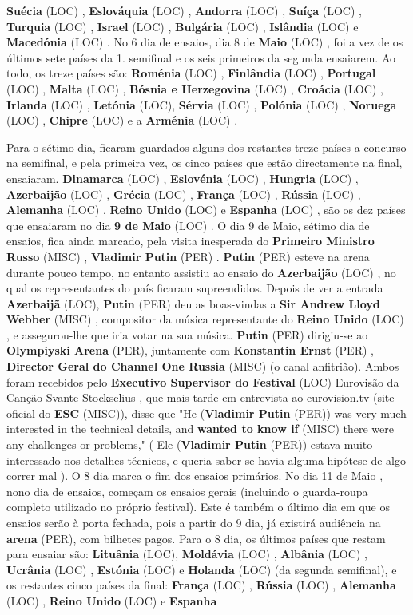 \documentclass[12pt,a4paper]{article}
\begin{document}
\textbf{Suécia} (LOC) , \textbf{Eslováquia} (LOC) , \textbf{Andorra} (LOC) , \textbf{Suíça} (LOC) , \textbf{Turquia} (LOC) , \textbf{Israel} (LOC) , \textbf{Bulgária} (LOC) , \textbf{Islândia} (LOC) e \textbf{Macedónia} (LOC) . No 6 dia de ensaios, dia 8 de \textbf{Maio} (LOC) , foi a vez de os últimos sete países da 1. semifinal e os seis primeiros da segunda ensaiarem. Ao todo, os treze países são: \textbf{Roménia} (LOC) , \textbf{Finlândia} (LOC) , \textbf{Portugal} (LOC) , \textbf{Malta} (LOC) , \textbf{Bósnia e Herzegovina} (LOC) , \textbf{Croácia} (LOC) , \textbf{Irlanda} (LOC) , \textbf{Letónia} (LOC), \textbf{Sérvia} (LOC) , \textbf{Polónia} (LOC) , \textbf{Noruega} (LOC) , \textbf{Chipre} (LOC) e a \textbf{Arménia} (LOC) .

Para o sétimo dia, ficaram guardados alguns dos restantes treze países a concurso na semifinal, e pela primeira vez, os cinco países que estão directamente na final, ensaiaram. \textbf{Dinamarca} (LOC) , \textbf{Eslovénia} (LOC) , \textbf{Hungria} (LOC) , \textbf{Azerbaijão} (LOC) , \textbf{Grécia} (LOC) , \textbf{França} (LOC) , \textbf{Rússia} (LOC) , \textbf{Alemanha} (LOC) , \textbf{Reino Unido} (LOC) e \textbf{Espanha} (LOC) , são os dez países que ensaiaram no dia \textbf{9 de Maio} (LOC) . O dia 9 de Maio, sétimo dia de ensaios, fica ainda marcado, pela visita inesperada do \textbf{Primeiro Ministro Russo} (MISC) , \textbf{Vladimir Putin} (PER) . \textbf{Putin} (PER) esteve na arena durante pouco tempo, no entanto assistiu ao ensaio do \textbf{Azerbaijão} (LOC) , no qual os representantes do país ficaram supreendidos. Depois de ver a entrada \textbf{Azerbaijã} (LOC), \textbf{Putin} (PER) deu as boas-vindas a \textbf{Sir Andrew Lloyd Webber} (MISC) , compositor da música representante do \textbf{Reino Unido} (LOC) , e assegurou-lhe que iria votar na sua música. \textbf{Putin} (PER) dirigiu-se ao \textbf{Olympiyski Arena} (PER), juntamente com \textbf{Konstantin Ernst} (PER) , \textbf{Director Geral do Channel One Russia} (MISC) (o canal anfitrião). Ambos foram recebidos pelo \textbf{Executivo Supervisor do Festival} (LOC) Eurovisão da Canção Svante Stockselius , que mais tarde em entrevista ao eurovision.tv (site oficial do \textbf{ESC} (MISC)), disse que "He (\textbf{Vladimir Putin} (PER)) was very much interested in the technical details, and \textbf{wanted to know if} (MISC) there were any challenges or problems," ( Ele (\textbf{Vladimir Putin} (PER)) estava muito interessado nos detalhes técnicos, e queria saber se havia alguma hipótese de algo correr mal ). O 8 dia marca o fim dos ensaios primários. No dia 11 de Maio , nono dia de ensaios, começam os ensaios gerais (incluindo o guarda-roupa completo utilizado no próprio festival). Este é também o último dia em que os ensaios serão à porta fechada, pois a partir do 9 dia, já existirá audiência na \textbf{arena} (PER), com bilhetes pagos. Para o 8 dia, os últimos países que restam para ensaiar são: \textbf{Lituânia} (LOC), \textbf{Moldávia} (LOC) , \textbf{Albânia} (LOC) , \textbf{Ucrânia} (LOC) , \textbf{Estónia} (LOC) e \textbf{Holanda} (LOC) (da segunda semifinal), e os restantes cinco países da final: \textbf{França} (LOC) , \textbf{Rússia} (LOC) , \textbf{Alemanha} (LOC) , \textbf{Reino Unido} (LOC) e \textbf{Espanha} 
\end{document}
